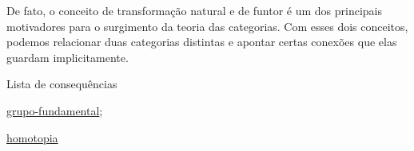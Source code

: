 De fato, o conceito de transformação natural e de funtor é um dos principais motivadores para o surgimento da teoria das categorias. Com esses dois conceitos, podemos relacionar duas categorias distintas e apontar certas conexões que elas guardam implicitamente.

\begin{titlemize}{Lista de consequências}
	\item \hyperref[grupo-fundamental]{grupo-fundamental};\\ %
	\item \hyperref[homotopia]{homotopia}
\end{titlemize}

